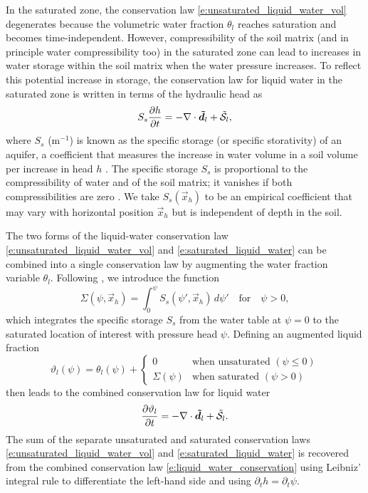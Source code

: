 \documentclass[twoside,10pt]{report}
\begin{document}
In the saturated zone, the conservation law \eqref{e:unsaturated_liquid_water_vol} degenerates because the volumetric water fraction $\theta_l$ reaches saturation and becomes time-independent. However, compressibility of the soil matrix (and in principle water compressibility too) in the saturated zone can lead to increases in water storage within the soil matrix when the water pressure increases. To reflect this potential increase in storage, the conservation law for liquid water in the saturated zone is written in terms of the hydraulic head as
\begin{equation}\label{e:saturated_liquid_water}
S_s \frac{\partial h}{\partial t} = - \nabla \cdot \boldsymbol{{\tilde d}}_l + \mathcal{\tilde S}_l,
\end{equation}
where $S_s$ ($\mathrm{m^{-1}}$) is known as the specific storage (or specific storativity) of an aquifer, a coefficient that measures the increase in water volume in a soil volume per increase in head $h$ \citep[][chapter~7]{Dingman15a}. The specific storage $S_s$ is proportional to the compressibility of water and of the soil matrix; it vanishes if both compressibilities are zero \citep[][chapter~5]{Bear18a}. We take $S_s(\vec{x}_h)$ to be an empirical coefficient that may vary with horizontal position $\vec{x}_h$ but is independent of depth in the soil.

The two forms of the liquid-water conservation law \eqref{e:unsaturated_liquid_water_vol} and \eqref{e:saturated_liquid_water} can be combined into a single conservation law by augmenting the water fraction variable $\theta_l$. Following \citet{Woodward00a}, we introduce the function
\begin{equation}
    \Sigma(\psi, \vec{x}_h) = \int_{0}^\psi S_s(\psi', \vec{x}_h)\,d\psi' \quad \text{for} \quad \psi > 0,
\end{equation}
which integrates the specific storage $S_s$ from the water table at $\psi=0$ to the saturated location of interest with pressure head $\psi$. 
Defining an augmented liquid fraction \citep{Woodward00a}
\begin{equation}\label{e:augmented_liquid_fraction}
    \vartheta_l(\psi) = \theta_l(\psi) + 
        \begin{cases}
        0 & \text{when unsaturated } (\psi \le 0)\\
        \Sigma(\psi) & \text{when saturated } (\psi > 0)
    \end{cases}
\end{equation}
then leads to the combined conservation law for liquid water 
\begin{equation}\label{e:liquid_water_conservation}
\frac{\partial \vartheta_l}{\partial t} = - \nabla \cdot \boldsymbol{{\tilde d}}_l + \mathcal{\tilde S}_l.
\end{equation}
The sum of the separate unsaturated and saturated conservation laws \eqref{e:unsaturated_liquid_water_vol} and \eqref{e:saturated_liquid_water} is recovered from the combined conservation law \eqref{e:liquid_water_conservation} using Leibniz' integral rule to differentiate the left-hand side and using $\partial_t h = \partial_t \psi$.
\end{document}
